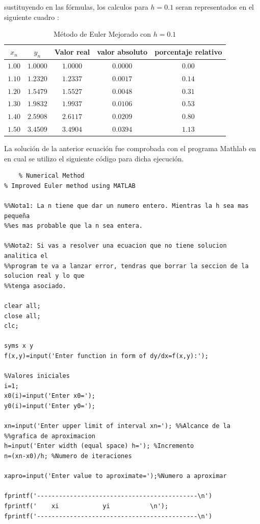 \documentclass[12 pt,letterpaper]{article}
\begin{document}
\begin{itemize}
\begin{flushleft}
sustituyendo en las fórmulas, los calculos para $h=0.1$ seran representados en el siguiente cuadro :\\
\end{flushleft}
\begin{table}[H]
\centering
\begin{tabular}{|c|c|c|c|c|}
   \hline
 $x_{n}$& $y_{n}$ & Valor real&valor absoluto& porcentaje relativo\\
\hline
 $1.00$& $1.0000$ &$1.0000$& $0.0000$& $0.00$\\
$1.10$& $1.2320$& $1.2337$&$ 0.0017$& $0.14$\\
$1.20 $&$1.5479$&$ 1.5527 $&$0.0048$&$ 0.31$\\
$1.30$&$ 1.9832$&$ 1.9937$&$ 0.0106$&$ 0.53$\\
$1.40$&$ 2.5908$&$ 2.6117$&$ 0.0209 $&$0.80$\\
$1.50 $&$3.4509$&$ 3.4904$&$ 0.0394$&$ 1.13$\\
\hline
\end{tabular}
 \caption{Método de Euler Mejorado con $h=0.1$}
    \label{}
\end{table}
La  solución de la anterior ecuación  fue comprobada con el programa Mathlab en en cual se utilizo el siguiente código para dicha ejecución.
	\begin{lstlisting}
	% Numerical Method 
% Improved Euler method using MATLAB 

%%Nota1: La n tiene que dar un numero entero. Mientras la h sea mas pequeña
%%es mas probable que la n sea entera.

%%Nota2: Si vas a resolver una ecuacion que no tiene solucion analitica el
%%program te va a lanzar error, tendras que borrar la seccion de la solucion real y lo que
%%tenga asociado.

clear all;
close all;
clc;

syms x y
f(x,y)=input('Enter function in form of dy/dx=f(x,y):');

%Valores iniciales
i=1;
x0(i)=input('Enter x0=');
y0(i)=input('Enter y0=');

xn=input('Enter upper limit of interval xn='); %%Alcance de la
%%grafica de aproximacion 
h=input('Enter width (equal space) h='); %Incremento
n=(xn-x0)/h; %Numero de iteraciones

xapro=input('Enter value to aproximate=');%Numero a aproximar

fprintf('--------------------------------------------\n')
fprintf('    xi            yi           \n');
fprintf('--------------------------------------------\n')


\end{lstlisting}
\end{itemize}
\end{document}
